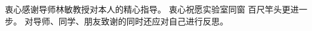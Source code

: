 \begin{acknowledgement}
    衷心感谢导师林敏教授对本人的精心指导。
    衷心祝愿实验室同窗 百尺竿头更进一步。
    对导师、同学、朋友致谢的同时还应对自己进行反思。
\end{acknowledgement}
